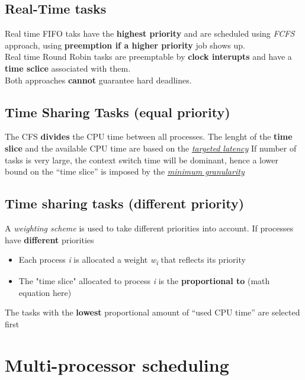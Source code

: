 \documentclass{article}
\newcommand{\worddef}[1]{\hyperref[sec:reference]{\textit{#1}}}
\begin{document}
\subsection{Real-Time tasks}
\begin{flushleft}
Real time FIFO taks have the \textbf{highest priority} and are scheduled using \textit{FCFS} approach, using \textbf{preemption if a higher priority} job shows up.\\
Real time Round Robin tasks are preemptable by \textbf{clock interupts} and have a \textbf{time sclice} associated with them.\\
Both approaches \textbf{cannot} guarantee hard deadlines.
\end{flushleft}

\subsection{Time Sharing Tasks (equal priority)}
\begin{flushleft}
The CFS \textbf{divides} the CPU time between all processes. The lenght of the \textbf{time slice} and the available CPU time are based on the \worddef{targeted latency}
If number of tasks is very large, the context switch time will be dominant, hence a lower bound on the “time slice” is imposed by the \worddef{minimum granularity}
\end{flushleft}

\subsection{Time sharing tasks (different priority)}
\begin{flushleft}
A \textit{weighting scheme} is used to take different priorities into account. If processes have \textbf{different} priorities
\begin{itemize}
	\item Each process \textit{i} is allocated a weight \textit{w\textsubscript{i}} that reflects its priority
	\item The "time slice" allocated to process \textit{i} is the \textbf{proportional to} (math equation here)\\
\end{itemize}
The tasks with the \textbf{lowest} proportional amount of “used CPU time” are selected first
\end{flushleft}

\section{Multi-processor scheduling}
\end{document}
